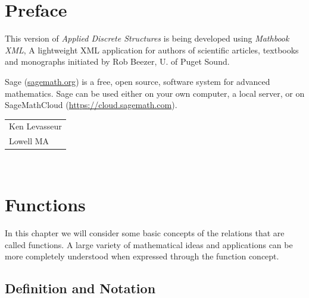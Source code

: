 \documentclass[10pt,]{book}
\theoremstyle{plain}
\theoremstyle{definition}
\theoremstyle{definition}
\theoremstyle{definition}
\begin{document}
\chapter*{Preface}\label{preface-1}
This version of \emph{Applied Discrete Structures} is being developed using \emph{Mathbook XML}, A lightweight XML application for authors of scientific articles, textbooks and monographs initiated by Rob Beezer, U. of Puget Sound.  %
\par
Sage (\href{http://sagemath.org}{sagemath.org}) is a free, open source, software system for advanced mathematics.  Sage can be used either on your own computer, a local server, or on SageMathCloud (\href{https://cloud.sagemath.com}{https://cloud.sagemath.com}). %
\par\hfill\begin{tabular}{l@{}}
Ken Levasseur\\
Lowell MA
\end{tabular}\\\par
\setcounter{tocdepth}{1}
\renewcommand*\contentsname{Contents}
\tableofcontents
\mainmatter
\typeout{************************************************}
\typeout{************************************************}
\chapter[Functions]{Functions}\label{chapter_7}
\typeout{************************************************}
\typeout{************************************************}
In this chapter we will consider some basic concepts of the relations that are called functions. A large variety of mathematical ideas and applications can be more completely understood when expressed through the function concept.%
\typeout{************************************************}
\typeout{************************************************}
\section[Definition and Notation]{Definition and Notation}\label{s-function-def-notation}
\typeout{************************************************}
\typeout{************************************************}
\end{document}
